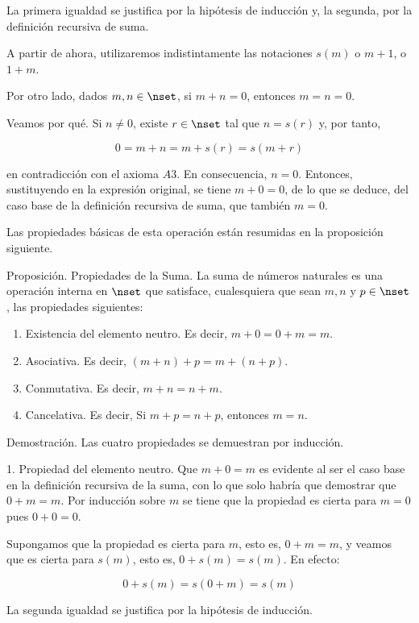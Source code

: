 \noindent La primera igualdad se justifica por la hipótesis de inducción y,
la segunda, por la definición recursiva de suma.

A partir de ahora, utilizaremos indistintamente las notaciones $s(m)$ o $m +
1$, o $1 + m$.

Por otro lado, dados $m, n \in \nset$, si $m + n = 0$, entonces $m = n = 0$.

Veamos por qué. Si $n \neq 0$, existe $r \in \nset$ tal que $n = s(r)$ y,
por tanto,

$$ 0 = m + n = m + s(r) = s(m + r) $$

\noindent en contradicción con el axioma $A3$. En consecuencia, $n = 0$.
Entonces, sustituyendo en la expresión original, se tiene $m + 0 = 0$, de lo
que se deduce, del caso base de la definición recursiva de suma, que también
$m = 0$.

Las propiedades básicas de esta operación están resumidas en la proposición
siguiente.

Proposición. Propiedades de la Suma. La suma de números naturales es una
operación interna en $\nset$ que satisface, cualesquiera que sean $m, n$ y
$p \in \nset$, las propiedades siguientes:

\begin{enumerate}
  \item Existencia del elemento neutro. Es decir, $m + 0 = 0 + m = m$.
  \item Asociativa. Es decir, $(m + n) + p = m + (n + p)$.
  \item Conmutativa. Es decir, $m + n = n + m$.
  \item Cancelativa. Es decir, Si $m + p = n + p$, entonces $m = n$.
\end{enumerate}

Demostración. Las cuatro propiedades se demuestran por inducción.

1. Propiedad del elemento neutro. Que $m + 0 = m$ es evidente al ser el caso
base en la definición recursiva de la suma, con lo que solo habría que
demostrar que $0 + m = m$. Por inducción sobre $m$ se tiene que la propiedad
es cierta para $m = 0$ pues $0 + 0 = 0$.

Supongamos que la propiedad es cierta para $m$, esto es, $0 + m = m$, y
veamos que es cierta para $s(m)$, esto es, $0 + s(m) = s(m)$. En efecto:

$$ 0 + s(m) = s(0 + m) = s(m) $$

\noindent La segunda igualdad se justifica por la hipótesis de inducción.

